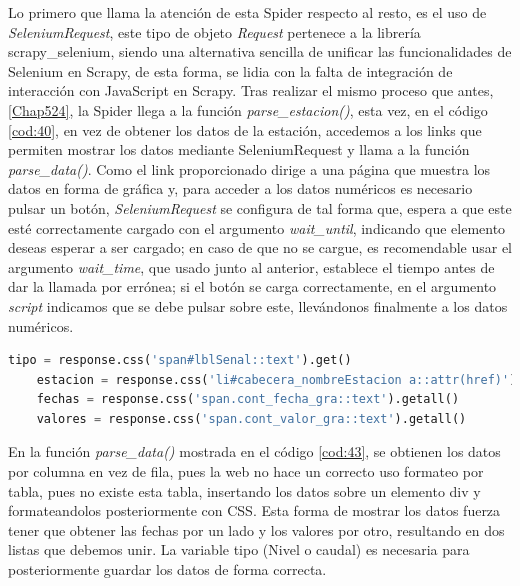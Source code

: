 Lo primero que llama la atención de esta Spider respecto al resto, es el uso de \textit{SeleniumRequest}, este tipo de objeto \textit{Request} pertenece a la librería scrapy\_selenium, siendo una alternativa sencilla de unificar las funcionalidades de Selenium en Scrapy, de esta forma, se lidia con la falta de integración de interacción con JavaScript en Scrapy.\newline
\newline
Tras realizar el mismo proceso que antes, \ref{Chap524}, la Spider llega a la función \textit{parse\_estacion()}, esta vez, en el código \ref{cod:40}, en vez de obtener los datos de la estación, accedemos a los links que permiten mostrar los datos mediante SeleniumRequest y llama a la función \textit{parse\_data()}.\newline
\newline
Como el link proporcionado dirige a una página que muestra los datos en forma de gráfica y, para acceder a los datos numéricos es necesario pulsar un botón, \textit{SeleniumRequest} se configura de tal forma que, espera a que este esté correctamente cargado con el argumento \textit{wait\_until}, indicando que elemento deseas esperar a ser cargado; en caso de que no se cargue, es recomendable usar el argumento \textit{wait\_time}, que usado junto al anterior, establece el tiempo antes de dar la llamada por errónea; si el botón se carga correctamente, en el argumento \textit{script} indicamos que se debe pulsar sobre este, llevándonos finalmente a los datos numéricos.

\begin{lstlisting}[language=Python, caption={Selector en \textit{parse\_data()} de Agua en Navarra Data Spider}, label=cod:43]
	tipo = response.css('span#lblSenal::text').get()
	estacion = response.css('li#cabecera_nombreEstacion a::attr(href)').get()
	fechas = response.css('span.cont_fecha_gra::text').getall()
	valores = response.css('span.cont_valor_gra::text').getall()
\end{lstlisting}

En la función \textit{parse\_data()} mostrada en el código \ref{cod:43}, se obtienen los datos por columna en vez de fila, pues la web no hace un correcto uso formateo por tabla, pues no existe esta tabla, insertando los datos sobre un elemento div y formateandolos posteriormente con CSS. Esta forma de mostrar los datos fuerza tener que obtener las fechas por un lado y los valores por otro, resultando en dos listas que debemos unir. La variable tipo (Nivel o caudal) es necesaria para posteriormente guardar los datos de forma correcta.

